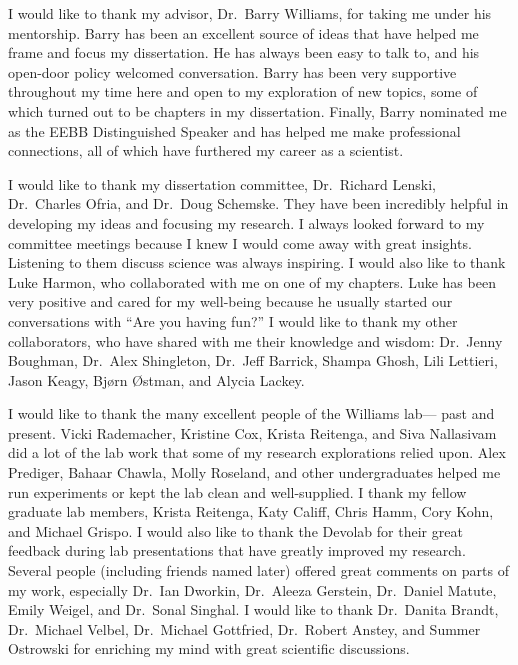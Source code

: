 \begin{acknowledgment}

I would like to thank my advisor, Dr.\ Barry Williams,
for taking me under his mentorship.
%
Barry has been an excellent source of ideas
that have helped me frame and focus my dissertation.
%
He has always been easy to talk to,
and his open-door policy welcomed conversation.
%
Barry has been very supportive throughout my time here
and open to my exploration of new topics,
some of which turned out to be chapters in my dissertation.
%
Finally, Barry nominated me as the EEBB Distinguished Speaker
and has helped me make professional connections,
all of which have furthered my career as a scientist.



I would like to thank my dissertation committee,
Dr.\ Richard Lenski, Dr.\ Charles Ofria, and Dr.\ Doug Schemske.
%
They have been incredibly helpful
in developing my ideas and focusing my research.
%
I always looked forward to my committee meetings
because I knew I would come away with great insights.
%
Listening to them discuss science was always inspiring.
%
I would also like to thank Luke Harmon,
who collaborated with me on one of my chapters.
%
Luke has been very positive and cared for my well-being
because he usually started our conversations with ``Are you having fun?''
%
I would like to thank my other collaborators,
who have shared with me their knowledge and wisdom:
Dr.\ Jenny Boughman, Dr.\ Alex Shingleton, Dr.\ Jeff Barrick,
Shampa Ghosh, Lili Lettieri, Jason Keagy, Bj\o rn \O stman, and Alycia Lackey.



I would like to thank the many excellent people of the Williams lab---%
past and present.
%
Vicki Rademacher, Kristine Cox, Krista Reitenga, and Siva Nallasivam
did a lot of the lab work that some of my research explorations relied upon.
%
Alex Prediger, Bahaar Chawla, Molly Roseland, and other undergraduates
helped me run experiments or kept the lab clean and well-supplied.
%
I thank my fellow graduate lab members, Krista Reitenga, Katy Califf,
Chris Hamm, Cory Kohn, and Michael Grispo.
%
I would also like to thank the Devolab for their great feedback
during lab presentations that have greatly improved my research.
%
Several people (including friends named later) offered great comments
on parts of my work, especially Dr.\ Ian Dworkin, Dr.\ Aleeza Gerstein,
Dr.\ Daniel Matute, Emily Weigel, and Dr.\ Sonal Singhal.
%
I would like to thank Dr.\ Danita Brandt, Dr.\ Michael Velbel,
Dr.\ Michael Gottfried, Dr.\ Robert Anstey, and Summer Ostrowski
for enriching my mind with great scientific discussions.




\end{acknowledgment}
